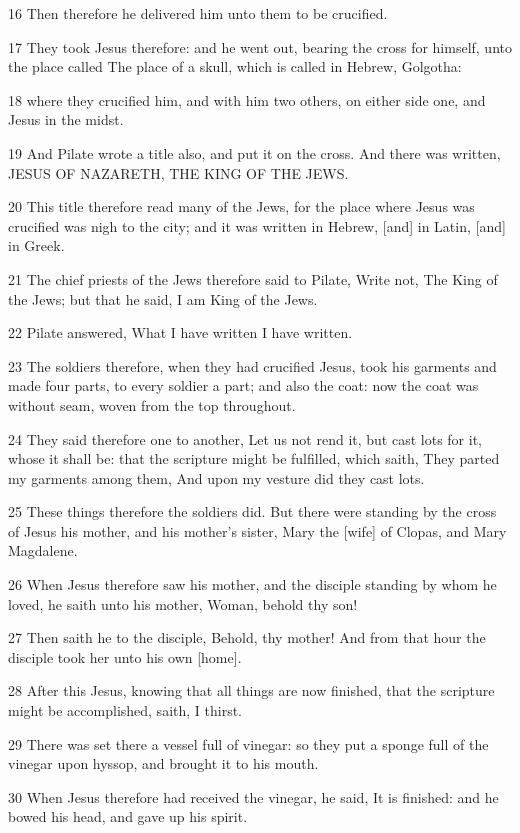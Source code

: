 \par 16 Then therefore he delivered him unto them to be crucified.
\par 17 They took Jesus therefore: and he went out, bearing the cross for himself, unto the place called The place of a skull, which is called in Hebrew, Golgotha:
\par 18 where they crucified him, and with him two others, on either side one, and Jesus in the midst.
\par 19 And Pilate wrote a title also, and put it on the cross. And there was written, JESUS OF NAZARETH, THE KING OF THE JEWS.
\par 20 This title therefore read many of the Jews, for the place where Jesus was crucified was nigh to the city; and it was written in Hebrew, [and] in Latin, [and] in Greek.
\par 21 The chief priests of the Jews therefore said to Pilate, Write not, The King of the Jews; but that he said, I am King of the Jews.
\par 22 Pilate answered, What I have written I have written.
\par 23 The soldiers therefore, when they had crucified Jesus, took his garments and made four parts, to every soldier a part; and also the coat: now the coat was without seam, woven from the top throughout.
\par 24 They said therefore one to another, Let us not rend it, but cast lots for it, whose it shall be: that the scripture might be fulfilled, which saith, They parted my garments among them, And upon my vesture did they cast lots.
\par 25 These things therefore the soldiers did. But there were standing by the cross of Jesus his mother, and his mother's sister, Mary the [wife] of Clopas, and Mary Magdalene.
\par 26 When Jesus therefore saw his mother, and the disciple standing by whom he loved, he saith unto his mother, Woman, behold thy son!
\par 27 Then saith he to the disciple, Behold, thy mother! And from that hour the disciple took her unto his own [home].
\par 28 After this Jesus, knowing that all things are now finished, that the scripture might be accomplished, saith, I thirst.
\par 29 There was set there a vessel full of vinegar: so they put a sponge full of the vinegar upon hyssop, and brought it to his mouth.
\par 30 When Jesus therefore had received the vinegar, he said, It is finished: and he bowed his head, and gave up his spirit.
